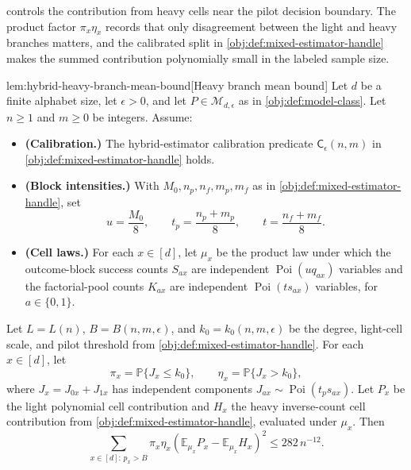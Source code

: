 \documentclass[11pt]{article}
\begin{document}
 controls the contribution from heavy cells near the pilot decision boundary. The product factor \(\pi_x\eta_x\) records that only disagreement between the light and heavy branches matters, and the calibrated split in \cref{obj:def:mixed-estimator-handle} makes the summed contribution polynomially small in the labeled sample size.

\begin{lemmav}{lem:hybrid-heavy-branch-mean-bound}[Heavy branch mean bound]
Let \(d\) be a finite alphabet size, let \(\epsilon>0\), and let \(P\in\mathcal M_{d,\epsilon}\) as in \cref{obj:def:model-class}.  Let \(n\ge1\) and \(m\ge0\) be integers.  Assume:
\begin{itemize}
\item \textbf{(Calibration.)} The hybrid-estimator calibration predicate \(\mathsf C_\epsilon(n,m)\) in \cref{obj:def:mixed-estimator-handle} holds.
\item \textbf{(Block intensities.)} With \(M_0,n_p,n_f,m_p,m_f\) as in \cref{obj:def:mixed-estimator-handle}, set
\[
u=\frac{M_0}{8},\qquad
t_p=\frac{n_p+m_p}{8},\qquad
t=\frac{n_f+m_f}{8}.
\]
\item \textbf{(Cell laws.)} For each \(x\in[d]\), let \(\mu_x\) be the product law under which the outcome-block success counts \(S_{ax}\) are independent \(\operatorname{Poi}(u q_{ax})\) variables and the factorial-pool counts \(K_{ax}\) are independent \(\operatorname{Poi}(t s_{ax})\) variables, for \(a\in\{0,1\}\).
\end{itemize}
Let \(L=L(n)\), \(B=B(n,m,\epsilon)\), and \(k_0=k_0(n,m,\epsilon)\) be the degree, light-cell scale, and pilot threshold from \cref{obj:def:mixed-estimator-handle}.  For each \(x\in[d]\), let
\[
\pi_x=\mathbb P\{J_x\le k_0\},
\qquad
\eta_x=\mathbb P\{J_x>k_0\},
\]
where \(J_x=J_{0x}+J_{1x}\) has independent components \(J_{ax}\sim\operatorname{Poi}(t_p s_{ax})\).  Let \(P_x\) be the light polynomial cell contribution and \(H_x\) the heavy inverse-count cell contribution from \cref{obj:def:mixed-estimator-handle}, evaluated under \(\mu_x\).  Then
\[
\sum_{x\in[d]:\,p_x>B}
\pi_x\eta_x
\left(\mathbb E_{\mu_x}P_x-\mathbb E_{\mu_x}H_x\right)^2
\le 282\,n^{-12}.
\]
\end{lemmav}
\end{document}
